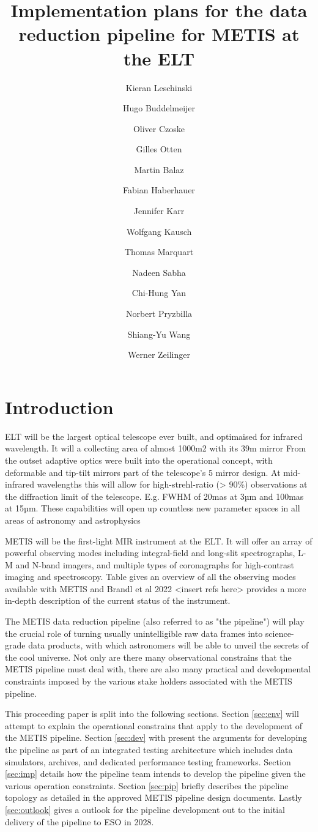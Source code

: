 \documentclass[a4paper]{spie}  %
\title{Implementation plans for the data reduction pipeline for METIS at the ELT}
\author[a]{Kieran Leschinski}
\author[a]{Hugo Buddelmeijer}
\author[a]{Oliver Czoske}
\author[b]{Gilles Otten}
\author[a]{Martin Balaz}
\author[a]{Fabian Haberhauer}
\author[b]{Jennifer Karr}
\author[c]{Wolfgang Kausch}
\author[d]{Thomas Marquart}
\author[c]{Nadeen Sabha}
\author[b]{Chi-Hung Yan}
\author[c]{Norbert Pryzbilla}
\author[b]{Shiang-Yu Wang}
\author[a]{Werner Zeilinger}
\affil[a]{University of Vienna, T\"urkenschanztra\ss e 18, 1180 Vienna, Austria}
\affil[b]{ASIAA, Taiwan}
\affil[c]{University of Innsbruck, Austria}
\affil[d]{University of Uppsala, Sweden}
\begin{document}
 
\maketitle

\begin{abstract}


\end{abstract}



\section{Introduction}
ELT will be the largest optical telescope ever built, and optimaised for infrared wavelength.
It will a collecting area of almost 1000m2 with its 39m mirror 
From the outset adaptive optics were built into the operational concept, with deformable and tip-tilt mirrors part of the telescope's 5 mirror design.
At mid-infrared wavelengths this will allow for high-strehl-ratio (> 90\%) observations at the diffraction limit of the telescope. 
E.g. FWHM of 20mas at 3µm and 100mas at 15µm.
These capabilities will open up countless new parameter spaces in all areas of astronomy and astrophysics


METIS will be the first-light MIR instrument at the ELT.
It will offer  an array of powerful observing modes including  integral-field and long-slit spectrographs, L-M and N-band imagers, and multiple types of coronagraphs for high-contrast imaging and spectroscopy.
Table gives an overview of all the observing modes available with METIS and Brandl et al 2022 <insert refs here> provides a more in-depth description of the current status of the instrument. 

The METIS data reduction pipeline (also referred to as  "the pipeline") will play the crucial role of turning usually unintelligible raw data frames into science-grade data products, with which astronomers will be able to unveil the secrets of the cool universe.
Not only are there many observational constrains that the METIS pipeline must deal with, there are also many practical and developmental constraints imposed by the various stake holders associated with the METIS pipeline.

This proceeding paper is split into the following sections. Section \ref{sec:env} will attempt to explain the operational constrains that apply to the development of the METIS pipeline. Section \ref{sec:dev} with present the arguments for developing the pipeline as part of an integrated testing architecture which includes data simulators, archives, and dedicated performance testing frameworks. Section \ref{sec:imp} details how the pipeline team intends to develop the pipeline given the various operation constraints. Section \ref{sec:pip} briefly describes the pipeline topology as detailed in the approved METIS pipeline design documents. Lastly \ref{sec:outlook} gives a outlook for the pipeline development out to the initial delivery of the pipeline to ESO in 2028.
\end{document}
